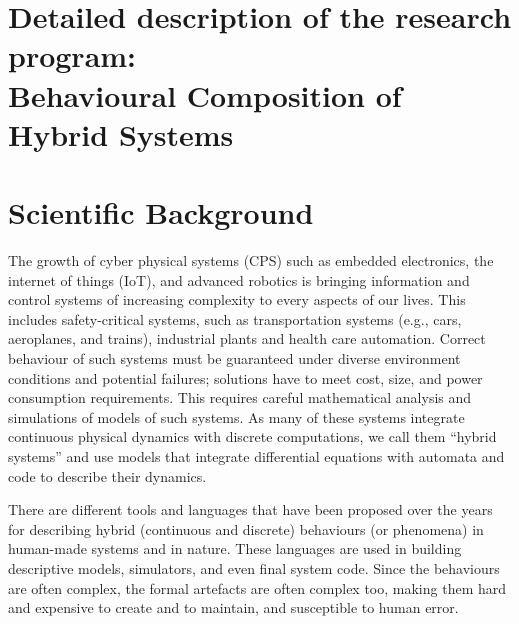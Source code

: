 \documentclass[11pt]{article}
\begin{document}
\section*{Detailed description of the research program: \\Behavioural Composition of Hybrid Systems}


\section{Scientific Background}\label{sec:motivation}
The growth of cyber physical systems (CPS) such as embedded electronics, the internet of things (IoT), and advanced robotics is bringing information and control systems of increasing complexity to every aspects of our lives. This includes safety-critical systems, such as transportation systems (e.g., cars, aeroplanes, and trains), industrial plants and health care automation. Correct behaviour of such systems must be guaranteed under diverse environment conditions and potential failures; solutions have to meet cost, size, and power consumption requirements. This requires careful mathematical analysis and simulations of models of such systems. As many of these systems integrate continuous physical dynamics with discrete computations, we call them ``hybrid systems” and use models that integrate differential equations with automata and code to describe their dynamics.

There are different tools and languages that have been proposed over the years for describing hybrid (continuous and discrete) behaviours (or phenomena) in human-made systems and in nature. These languages are used in building descriptive models, simulators, and even final system code. Since the behaviours are often complex, the formal artefacts are often complex too, making them hard and expensive to create and to maintain, and susceptible to human error.
\end{document}
